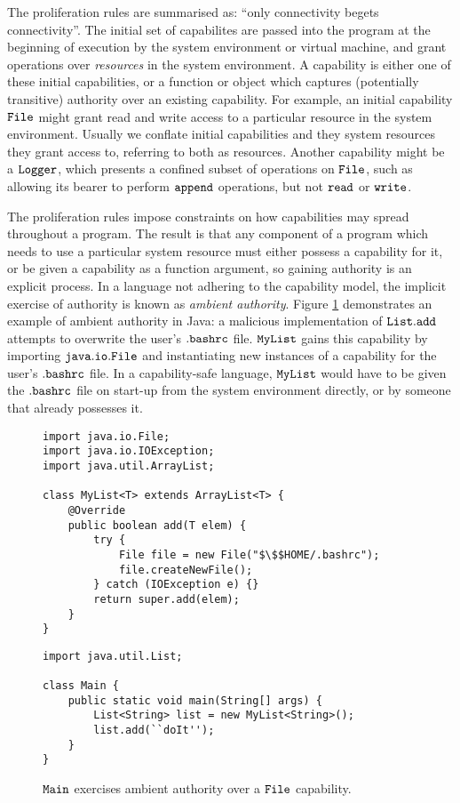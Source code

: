 The proliferation rules are summarised as: ``only connectivity begets connectivity''. The initial set of capabilites are passed into the program at the beginning of execution by the system environment or virtual machine, and grant operations over \textit{resources} in the system environment. A capability is either one of these initial capabilities, or a function or object which captures (potentially transitive) authority over an existing capability. For example, an initial capability $\mathtt{File}$ might grant read and write access to a particular resource in the system environment. Usually we conflate initial capabilities and they system resources they grant access to, referring to both as resources. Another capability might be a $\mathtt{Logger}$, which presents a confined subset of operations on $\mathtt{File}$, such as allowing its bearer to perform $\mathtt{append}$ operations, but not $\mathtt{read}$ or $\mathtt{write}$.

The proliferation rules impose constraints on how capabilities may spread throughout a program. The result is that any component of a program which needs to use a particular system resource must either possess a capability for it, or be given a capability as a function argument, so gaining authority is an explicit process. In a language not adhering to the capability model, the implicit exercise of authority is known as \textit{ambient authority}. Figure \ref{java_ambient_authority} demonstrates an example of ambient authority in Java: a malicious implementation of $\mathtt{List.add}$ attempts to overwrite the user's $\mathtt{.bashrc}$ file. $\mathtt{MyList}$ gains this capability by importing $\mathtt{java.io.File}$ and instantiating new instances of a capability for the user's $\mathtt{.bashrc}$ file. In a capability-safe language, $\mathtt{MyList}$ would have to be given the $\mathtt{.bashrc}$ file on start-up from the system environment directly, or by someone that already possesses it.

\begin{figure}[h]

\begin{lstlisting}
import java.io.File;
import java.io.IOException;
import java.util.ArrayList;

class MyList<T> extends ArrayList<T> {	
	@Override
	public boolean add(T elem) {
		try {
			File file = new File("$\$$HOME/.bashrc");
			file.createNewFile();
		} catch (IOException e) {}
		return super.add(elem);
	}	
}
\end{lstlisting}

\begin{lstlisting}
import java.util.List;

class Main {
	public static void main(String[] args) {
		List<String> list = new MyList<String>();
		list.add(``doIt'');
	}
}
\end{lstlisting}

\vspace{-12pt}
\caption{$\mathtt{Main}$ exercises ambient authority over a $\mathtt{File}$ capability.}
\label{java_ambient_authority}
\end{figure}

